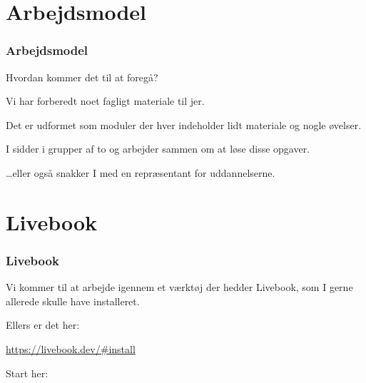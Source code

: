 
\section{Arbejdsmodel}
\begin{frame}
  \frametitle{Arbejdsmodel}
  Hvordan kommer det til at foregå?
  
  Vi har forberedt noet fagligt materiale til jer.
  
  Det er udformet som moduler der hver indeholder lidt materiale og nogle øvelser.
  
  I sidder i grupper af to og arbejder sammen om at løse disse opgaver.
  
  \ldots eller også snakker I med en repræsentant for uddannelserne.
\end{frame}

\section{Livebook}
\begin{frame}
    \frametitle{Livebook}
    \vspace{5mm}
    Vi kommer til at arbejde igennem et værktøj der hedder Livebook, som I gerne allerede skulle have installeret.
    
    \vspace{7mm}
    Ellers er det her:
    \begin{center}
      \url{https://livebook.dev/\#install}
    \end{center}
    
    \vspace{7mm}
    Start her:
    \begin{center}
    \end{center}
\end{frame}

